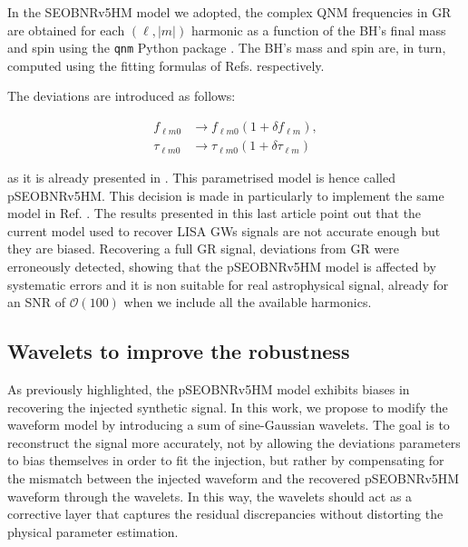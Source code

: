 In the SEOBNRv5HM model we adopted, the complex QNM frequencies in GR are obtained for each $(\ell , |m|) $ harmonic as a function of the BH’s final mass and spin using the \texttt{qnm} Python package \cite{Stein_2019}. The BH’s mass and spin are, in turn, computed using the fitting formulas of Refs. \cite{Jim_nez_Forteza_2017, Hofmann_2016} respectively.

The deviations are introduced as follows:
 
\begin{align}
f_{\ell m 0} &\rightarrow f_{\ell m 0} \left(1 + \delta f_{\ell m} \right), \tag{2.9a} \\
\tau_{\ell m 0} &\rightarrow \tau_{\ell m 0} \left(1 + \delta \tau_{\ell m} \right) \tag{2.9b}
\end{align}

\noindent
as it is already presented in \cite{toubiana2024measuringsourcepropertiesquasinormalmode, Brito_2018, isi2021analyzingblackholeringdowns, Meidam_2014}. This parametrised model is hence called pSEOBNRv5HM. 
This decision is made in particularly to implement the same model in Ref. \cite{toubiana2024measuringsourcepropertiesquasinormalmode}. The results presented in this last article point out that the current model used to recover LISA GWs signals are not accurate enough but they are biased. Recovering a full GR signal, deviations from GR were erroneously detected, showing that the pSEOBNRv5HM model is affected by systematic errors and it is non suitable for real astrophysical signal, already for an SNR of $\mathcal{O}(100)$ when we include all the available harmonics. 


\subsection{Wavelets to improve the robustness}

As previously highlighted, the pSEOBNRv5HM model exhibits biases in recovering the injected synthetic signal. In this work, we propose to modify the waveform model by introducing a sum of sine-Gaussian wavelets. The goal is to reconstruct the signal more accurately, not by allowing the deviations parameters to bias themselves in order to fit the injection, but rather by compensating for the mismatch between the injected waveform and the recovered pSEOBNRv5HM waveform through the wavelets. In this way, the wavelets should act as a corrective layer that captures the residual discrepancies without distorting the physical parameter estimation. 

